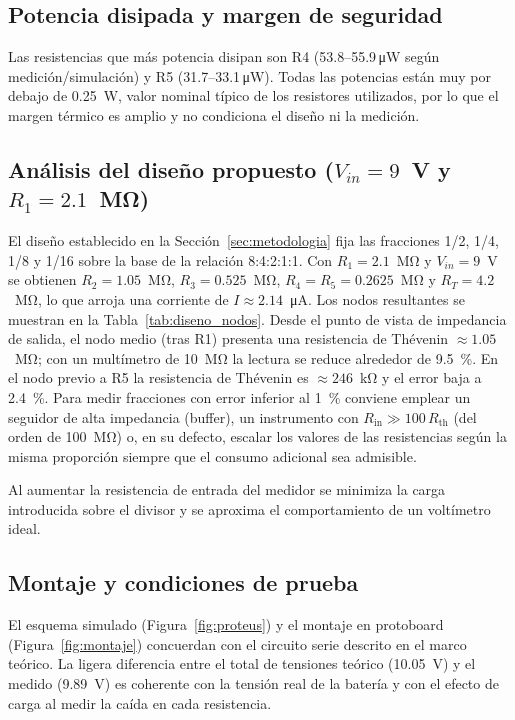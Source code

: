 \documentclass[conference]{IEEEtran}
\begin{document}
\subsection{Potencia disipada y margen de seguridad}
Las resistencias que más potencia disipan son R4 (\mbox{53.8--55.9\,\si{\micro W}} según medición/simulación) y R5 (\mbox{31.7--33.1\,\si{\micro W}}).  Todas las potencias están muy por debajo de 0.25~W, valor nominal típico de los resistores utilizados, por lo que el margen térmico es amplio y no condiciona el diseño ni la medición.

\subsection{Análisis del diseño propuesto (\texorpdfstring{$V_{in}=9$~V}{Vin=9 V} y \texorpdfstring{$R_1=2{.}1$~M\si{\ohm}}{R1=2.1 MΩ})}
El diseño establecido en la Sección~\ref{sec:metodologia} fija las fracciones 1/2, 1/4, 1/8 y 1/16 sobre la base de la relación \mbox{8:4:2:1:1}.  Con \mbox{$R_1=2.1$~M\si{\ohm}} y \mbox{$V_{in}=9$~V} se obtienen \mbox{$R_2=1.05$~M\si{\ohm}}, \mbox{$R_3=0.525$~M\si{\ohm}}, \mbox{$R_4=R_5=0.2625$~M\si{\ohm}} y \mbox{$R_T=4.2$~M\si{\ohm}}, lo que arroja una corriente de \mbox{$I\approx 2.14$~\si{\micro A}}.  Los nodos resultantes se muestran en la Tabla~\ref{tab:diseno_nodos}.  Desde el punto de vista de impedancia de salida, el nodo medio (tras R1) presenta una resistencia de Thévenin \mbox{$\approx 1.05$~M\si{\ohm}}; con un multímetro de 10~M\si{\ohm} la lectura se reduce alrededor de 9.5~\%.  En el nodo previo a R5 la resistencia de Thévenin es \mbox{$\approx 246$~k\si{\ohm}} y el error baja a \mbox{2.4~\%}.  Para medir fracciones con error inferior al 1~\% conviene emplear un seguidor de alta impedancia (buffer), un instrumento con \mbox{$R_{\mathrm{in}}\gg 100\,R_{\mathrm{th}}$} (del orden de 100~M\si{\ohm}) o, en su defecto, escalar los valores de las resistencias según la misma proporción siempre que el consumo adicional sea admisible\cite{ref:guia}.

Al aumentar la resistencia de entrada del medidor se minimiza la carga introducida sobre el divisor y se aproxima el comportamiento de un voltímetro ideal\cite{ref:aac_voltmeter}.

\subsection{Montaje y condiciones de prueba}
El esquema simulado (Figura~\ref{fig:proteus}) y el montaje en protoboard (Figura~\ref{fig:montaje}) concuerdan con el circuito serie descrito en el marco teórico.  La ligera diferencia entre el total de tensiones teórico (10.05~V) y el medido (9.89~V) es coherente con la tensión real de la batería y con el efecto de carga al medir la caída en cada resistencia.
\end{document}

